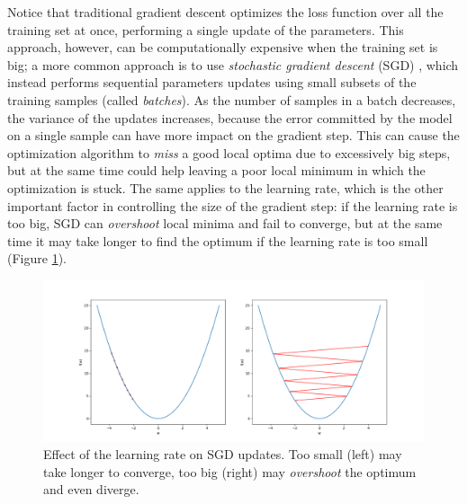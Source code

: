 Notice that traditional gradient descent optimizes the loss function over all 
the training set at once, performing a single update of the parameters. 
This approach, however, can be computationally expensive when the training set
is big; a more common approach is to use \textit{stochastic gradient descent} 
(SGD) \cite{bishop2006pattern}, which instead performs sequential parameters 
updates using small subsets of the training samples (called \textit{batches}). 
As the number of samples in a batch decreases, the variance of the 
updates increases, because the error committed by the model on a single sample 
can have more impact on the gradient step. This can cause the optimization 
algorithm to \textit{miss} a good local optima due to excessively big steps, but
at the same time could help leaving a poor local minimum in which the 
optimization is stuck. The same applies to the learning rate, which is the other
important factor in controlling the size of the gradient step: if the learning 
rate is too big, SGD can \textit{overshoot} local minima and fail to converge, 
but at the same time it may take longer to find the optimum if the learning rate
is too small (Figure \ref{f:sgd_overshooting}).
%
\begin{figure}
    \includegraphics[width=\textwidth]{pictures/SGD_overshooting}
    \centering
    \caption[Effect of the learning rate on SGD updates]{Effect of the learning 
	    rate on SGD updates. Too small (left) may take longer to converge, 
	    too big (right) may \textit{overshoot} the optimum and even diverge.}
    \label{f:sgd_overshooting}
\end{figure}
%

